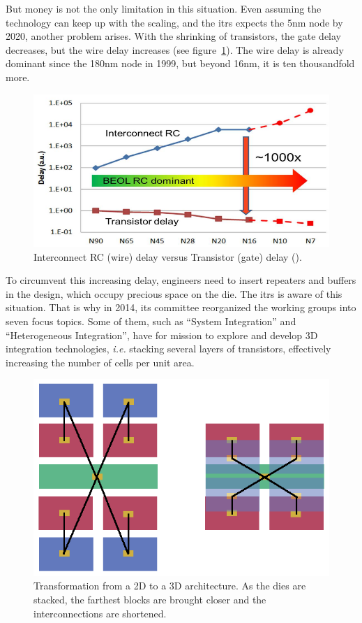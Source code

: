 \documentclass[11pt,a4paper]{report} %
\theoremstyle{customdef}
\begin{document}
But money is not the only limitation in this situation.
Even assuming the technology can keep up with the scaling, and the \gls{itrs} expects the 5nm node by 2020, another problem arises.
With the shrinking of transistors, the gate delay decreases, but the wire delay increases (see figure~\ref{fig:delay}).
The wire delay is already dominant since the 180nm node in 1999, but beyond 16nm, it is ten thousandfold more.

\begin{figure}[!h]
\centering
\includegraphics[width=.8\textwidth]{img/beol-delay.png}
\caption{Interconnect RC (wire) delay versus Transistor (gate) delay (\citep{Yeap2013}).}
\label{fig:delay}
\end{figure}

To circumvent this increasing delay, engineers need to insert repeaters and buffers in the design, which occupy precious space on the die.
The \gls{itrs} is aware of this situation.
That is why in 2014, its committee reorganized the working groups into seven focus topics.
Some of them, such as “System Integration” and “Heterogeneous Integration”, have for mission to explore and develop 3D integration technologies, \textit{i.e.} stacking several layers of transistors, effectively increasing the number of cells per unit area.

\begin{figure}[!h]
\centering
\includegraphics[width=.4\textwidth]{img/2dto3d.png}
\caption{Transformation from a 2D to a 3D architecture. As the dies are stacked, the farthest blocks are brought closer and the interconnections are shortened.}
\label{fig:2dto3d}
\end{figure}
\end{document}
